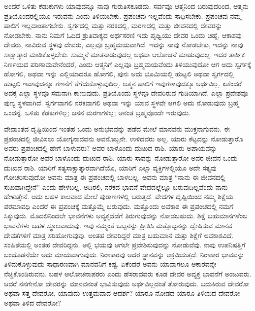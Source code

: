 \vskip 6pt

ಅಂದರೆ ಒಳಿತು ಕೆಡುಕುಗಳು ಯಾವುದನ್ನೂ ನಾವು ಗುರುತಿಸಕೂಡದು. ಸರ್ವವೂ ಆತ್ಮನಿಂದ ಬರುವುದರಿಂದ, ಆತ್ಮನು ಪ್ರತಿಯೊಂದರಲ್ಲಿಯೂ ಇರುವನು ಎಂದು ತಿಳಿಯಬೇಕು. ಪ್ರಪಂಚವು ಇಲ್ಲವೆಂದು ಸಾಧಿಸಬೇಕು. ಪ್ರಪಂಚವು ನಮ್ಮ ಪಾಲಿಗೆ ಇಲ್ಲದಾಂತಾಗಬೇಕು. ಸ್ವರ್ಗದಲ್ಲಿ ಮತ್ತು ನರಕದಲ್ಲಿ, ಮರಣದಲ್ಲಿ ಮತ್ತು ಜೀವನದಲ್ಲಿ ದೇವರನ್ನು ನೋಡಬೇಕು. ನಾನು ನಿಮಗೆ ಓದಿದ ಶ್ರುತಿವಾಕ್ಯದ ಅರ್ಥಸರಣಿ ಇದು ಪೃಥ್ವಿಯು ದೇವರ ಒಂದು ಚಿಹ್ನೆ, ಆಕಾಶವು ದೇವರು, ನಾವಿರುವ ಸ್ಥಳವು ದೇವರು, ಎಲ್ಲವೂ ಬ್ರಹ್ಮಮಯವಾಗಿದೆ. ಇದನ್ನು ನಾವು ನೋಡಬೇಕು, ಇದನ್ನು ನಾವು ಸಾಕ್ಷಾತ್ಕಾರ ಮಾಡಿಕೊಳ್ಳಬೇಕು. ಸುಮ್ಮನೆ ಮಾತನಾಡುವುದಲ್ಲ ಅಥವಾ ಆಲೋಚನೆ ಮಾಡುವುದಲ್ಲ. ಇದರ ತಾರ್ಕಿಕ ನಿರ್ಣಯದ ಪರಿಣಾಮವೇನೆಂದರೆ, ಎಂದು ಆತ್ಮನಿಗೆ ಎಲ್ಲವೂ ಬ್ರಹ್ಮಮಯವೆಂದು ತಿಳಿಯುವುದೋ ಆಗ ಅದು ಸ್ವರ್ಗಕ್ಕೆ ಹೋಗಲಿ, ಅಥವಾ ಇನ್ನು ಎಲ್ಲಿಯಾದರೂ ಹೋಗಲಿ, ಪುನಃ ಅದು ಭೂಮಿಯಲ್ಲಿ ಹುಟ್ಟಲಿ ಅಥವಾ ಸ್ವರ್ಗದಲ್ಲಿ ಹುಟ್ಟಲಿ ಇವಾವುದನ್ನೂ ಗಣನೆಗೆ ತೆಗೆದುಕೊಳ್ಳುವುದಿಲ್ಲ. ಆತ್ಮನ ಪಾಲಿಗೆ ಇವುಗಳಾವುದಕ್ಕೂ ಅರ್ಥವಿಲ್ಲ. ಏಕೆಂದರೆ ಅದಕ್ಕೆ ಎಲ್ಲಾ ಸ್ಥಳವೂ ಸಮನಾಗಿ ಕಾಣುವುದು. ಪ್ರತಿಯೊಂದು ಸ್ಥಳವೂ ದೇವರಿರುವ ಗುಡಿಯಾಗಿದೆ. ಎಲ್ಲಾ ಪ್ರದೇಶವೂ ಪುಣ್ಯ ಸ್ಥಳವಾಗಿದೆ. ಸ್ವರ್ಗವಾಗಲಿ ನರಕವಾಗಲಿ ಅಥವಾ ಇನ್ನು ಯಾವ ಸ್ಥಳವೇ ಆಗಲಿ ಅದು ನೋಡುವುದು ಬ್ರಹ್ಮ ಒಂದನ್ನೆ. ಒಳಿತು ಕೆಡಕುಗಳಿಲ್ಲ; ಜನನ ಮರಣಗಳಿಲ್ಲ; ಅನಂತ ಬ್ರಹ್ಮವೊಂದೇ ಇರುವುದು. 

\vskip 6pt

ವೇದಾಂತದ ದೃಷ್ಟಿಯಿಂದ ಇಂತಹ ಒಂದು ಅನುಭವವನ್ನು ಪಡೆದ ಮೇಲೆ ಮಾನವನು ಮುಕ್ತನಾಗುವನು. ಈ ಪ್ರಪಂಚದಲ್ಲಿ ಜೀವಿಸಲು ಯೋಗ್ಯನಾದವನು ಅವನೊಬ್ಬನೇ. ಉಳಿದವರು ಅಲ್ಲ. ಯಾರು ಕೆಟ್ಟದನ್ನು ನೋಡುತ್ತಾರೊ ಅವರು ಪ್ರಪಂಚದಲ್ಲಿ ಹೇಗೆ ಬಾಳುವರು? ಅವರ ಬಾಳೊಂದು ದುಃಖದ ರಾಶಿ. ಯಾರು ಅಪಾಯವನ್ನು ನೋಡುತ್ತಾರೋ ಅವರ ಬಾಳೊಂದು ದುಃಖದ ರಾಶಿ. ಯಾರು ಸಾವನ್ನು ನೋಡುತ್ತಾರೋ ಅವರ ಜೀವನ ಒಂದು ದುಃಖದ ರಾಶಿ. ಯಾರಿಗೆ ಸತ್ಯಸಾಕ್ಷಾತ್ಕಾರವಾಗಿದೆಯೊ, ಯಾರಿಗೆ ಎಲ್ಲಾ ವ್ಯಕ್ತಿಗಳಲ್ಲಿಯೂ ಅದೇ ಸತ್ಯವು ಗೋಚರಿಸುವುದೋ ಅವನು ಮಾತ್ರ ಈ ಪ್ರಪಂಚದಲ್ಲಿ ಬಾಳಬಲ್ಲ. ಅವನು ಮಾತ್ರ “ನಾನು ಈ ಜೀವನದಲ್ಲಿ ಸುಖವಾಗಿದ್ದೇನೆ” ಎಂದು ಹೇಳಬಲ್ಲ. ಅದಿರಲಿ, ನರಕದ ಭಾವನೆ ವೇದದಲ್ಲೆಲ್ಲೂ ಬರುವುದಿಲ್ಲವೆಂದು ನಾನು ಹೇಳುತ್ತೇನೆ. ಅದು ಬಹಳ ಕಾಲವಾದ ಮೇಲೆ ಪುರಾಣಗಳಲ್ಲಿ ಬರುತ್ತದೆ. ವೇದಗಳ ದೃಷ್ಟಿಯಿಂದ ನಮ್ಮ ಶಿಕ್ಷೆಯ ಪರಮಾವಧಿ ಎಂದರೆ ಈ ಪ್ರಪಂಚಕ್ಕೆ ಮತ್ತೊಮ್ಮೆ ಬರುವುದು. ಮತ್ತೊಂದು ಅವಕಾಶ ಈ ಪ್ರಪಂಚದಲ್ಲಿ ನಮಗೆ ಸಿಕ್ಕುವುದು. ಮೊದಲಿನಿಂದಲೇ ಭಾವನೆಗಳು ಅವ್ಯಕ್ತದೆಡೆಗೆ ತಿರುಗುವುದನ್ನು ನೋಡಬಹುದು. ಶಿಕ್ಷೆ ಬಹುಮಾನಗಳೆಂಬ ಭಾವನೆಗಳು ಬಹಳ ಸ್ಥೂಲವಾದುವು. ಇವು ನಮ್ಮಂತೆ ಒಬ್ಬನನ್ನು ಪ್ರೀತಿಸಿ ಮತ್ತೊಬ್ಬನನ್ನು ದ್ವೇಷಿಸುವ ಮಾನವ ದೇವತೆಗಳಿಗೆ ಮಾತ್ರ ಸರಿಹೋಗುವುವು. ಅಂತಹ ದೇವರಿದ್ದರೆ ಮಾತ್ರ ಬಹುಮಾನ ಮತ್ತು ಶಿಕ್ಷೆಗೆ ಅವಕಾಶವಿದೆ. ಸಂಹಿತೆಯಲ್ಲಿ ಅಂತಹ ದೇವರಿದ್ದನು. ಅಲ್ಲಿ ಭಯವು ಆಗಲೇ ಪ್ರವೇಶಿಸುವುದನ್ನು ನೋಡುವೆವು. ನಾವು ಉಪನಿಷತ್ತಿಗೆ ಬಂದೊಡನೆಯೇ ಅದು ಮಾಯವಾಗುವುದು. ನಿರಾಕಾರವು ಅದರ ಸ್ಥಾನವನ್ನು ಆಕ್ರಮಿಸುತ್ತದೆ. ನಿರಾಕಾರ ಭಾವವನ್ನು ತಿಳಿದುಕೊಳ್ಳುವುದು ಸಾಧಾರಣವಾಗಿ ಮಾನವನಿಗೆ ಕಷ್ಟ. ಏಕೆಂದರೆ ಅವನು ಯಾವಾಗಲೂ ಆಕಾರವನ್ನೇ ನೆಚ್ಚಿಕೊಂಡಿರುವನು. ಬಹಳ ಆಲೋಚನಾಪರರು ಎಂದು ಹೆಸರಾದವರು ಕೂಡ ದೇವರ ಅವ್ಯಕ್ತ ಭಾವನೆಗೆ ಅಂಜುವರು. ಆದರೆ ನನಗೇನೋ ದೇವರನ್ನು ಮಾನವನಂತೆ ಭಾವಿಸುವುದು ಅರ್ಥವಿಲ್ಲದಂತೆ ತೋರುವುದು. ಬದುಕಿರುವ ದೇವರೋ ಅಥವಾ ಸತ್ತ ದೇವರೋ, ಯಾವುದು ಉತ್ತಮವಾದ ಆದರ್ಶ? ಯಾರೂ ನೋಡದ ಯಾರೂ ತಿಳಿಯದ ದೇವರೋ ಅಥವಾ ತಿಳಿದ ದೇವರೋ?


